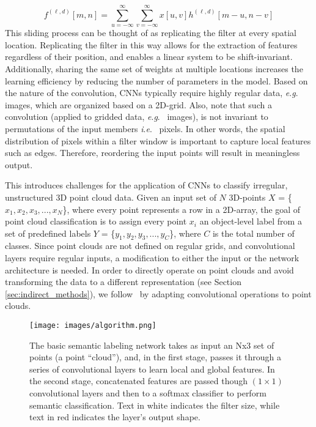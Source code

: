 \documentclass[final,3p,times,twocolumn,authoryear]{elsarticle}
\newcommand{\ie}{\textit{i}.\textit{e}.}
\newcommand{\eg}{\textit{e}.\textit{g}.}
\begin{document}
\begin{equation}
\label{eq:1}
f^{(\ell,d)}[m,n] = \sum_{u=-\infty}^{\infty} \sum_{v=-\infty}^{\infty} x[u,v] h^{(\ell,d)}[m-u,n-v]
\end{equation}
This sliding process can be thought of as replicating the filter at every spatial location.
Replicating the filter in this way allows for the extraction of features regardless of their position, and enables a linear system to be shift-invariant. 
Additionally, sharing the same set of weights at multiple locations increases the learning efficiency by reducing the number of parameters in the model. 
Based on the nature of the convolution, CNNs typically require highly regular data, \eg~ images, which are organized based on a 2D-grid. 
Also, note that such a convolution (applied to gridded data, \eg~ images), is not invariant to permutations of the input members \ie~ pixels. 
In other words, the spatial distribution of pixels within a filter window is important to capture local features such as edges. Therefore, reordering the input points will result in meaningless output. 

This introduces challenges for the application of CNNs to classify irregular, unstructured 3D point cloud data. 
Given an input set of $N$ 3D-points $X$ = \{$x_{1},x_{2},x_{3},...,x_{N}$\}, where every point represents a row in a 2D-array, the goal of point cloud classification is to assign every point $x_{i}$ an object-level label from a set of predefined labels $Y$ = \{$y_{1},y_{2},y_{3},...,y_{C}$\}, where $C$ is the total number of classes. 
Since point clouds are not defined on regular grids, and convolutional layers require regular inputs, a modification to either the input or the network architecture is needed. 
In order to directly operate on point clouds and avoid transforming the data to a different representation (see Section \ref{sec:indirect_methods}), we follow~\citep{pointnet} by adapting convolutional operations to point clouds. 

\begin{figure*}[th]
\begin{center}
\texttt{[image: images/algorithm.png]}
\end{center}
\caption{The basic semantic labeling network takes as input an Nx3 set of points (a point ``cloud''), and, in the first stage, passes it through a series of convolutional layers to learn local and global features. In the second stage, concatenated features are passed though $(1\times1)$ convolutional layers and then to a softmax classifier to perform semantic classification. Text in white indicates the filter size, while text in red indicates the layer's output shape.}
\label{fig:algorithm}
\end{figure*}
\end{document}
